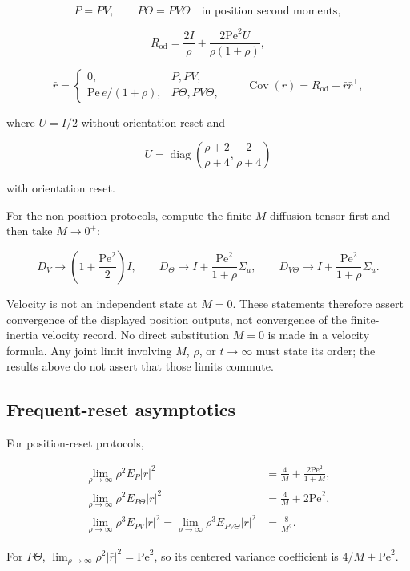 \[
P=PV,\qquad P\Theta=PV\Theta
\quad\text{in position second moments},
\]

\[
R_{\mathrm{od}}
=\frac{2I}{\rho}
+\frac{2\mathrm{Pe}^2U}{\rho(1+\rho)},
\]

\[
\bar r=
\begin{cases}
0,&P,PV,\\[1mm]
\mathrm{Pe}\,e/(1+\rho),&P\Theta,PV\Theta,
\end{cases}
\qquad
\operatorname{Cov}(r)=R_{\mathrm{od}}-\bar r\bar r^\mathsf T,
\]

where \(U=I/2\) without orientation reset and

\[
U=\operatorname{diag}\left(\frac{\rho+2}{\rho+4},
                           \frac{2}{\rho+4}\right)
\]

with orientation reset.

For the non-position protocols, compute the finite-\(M\) diffusion tensor first and then take \(M\to0^+\):

\[
D_V\longrightarrow
\left(1+\frac{\mathrm{Pe}^2}{2}\right)I,
\qquad
D_\Theta\longrightarrow
I+\frac{\mathrm{Pe}^2}{1+\rho}\Sigma_u,
\qquad
D_{V\Theta}\longrightarrow
I+\frac{\mathrm{Pe}^2}{1+\rho}\Sigma_u.
\]

Velocity is not an independent state at \(M=0\). These statements therefore assert convergence of the displayed position outputs, not convergence of the finite-inertia velocity record. No direct substitution \(M=0\) is made in a velocity formula. Any joint limit involving \(M\), \(\rho\), or \(t\to\infty\) must state its order; the results above do not assert that those limits commute.

\subsection{Frequent-reset asymptotics}\label{s6.5-frequent-reset-asymptotics}

For position-reset protocols,

\[
\begin{aligned}
\lim_{\rho\to\infty}\rho^2E_P|r|^2
&=\frac4M+\frac{2\mathrm{Pe}^2}{1+M},\\
\lim_{\rho\to\infty}\rho^2E_{P\Theta}|r|^2
&=\frac4M+2\mathrm{Pe}^2,\\
\lim_{\rho\to\infty}\rho^3E_{PV}|r|^2
=\lim_{\rho\to\infty}\rho^3E_{PV\Theta}|r|^2
&=\frac8{M^2}.
\end{aligned}
\]

For \(P\Theta\), \(\lim_{\rho\to\infty}\rho^2|\bar r|^2=\mathrm{Pe}^2\), so its centered variance coefficient is \(4/M+\mathrm{Pe}^2\).

